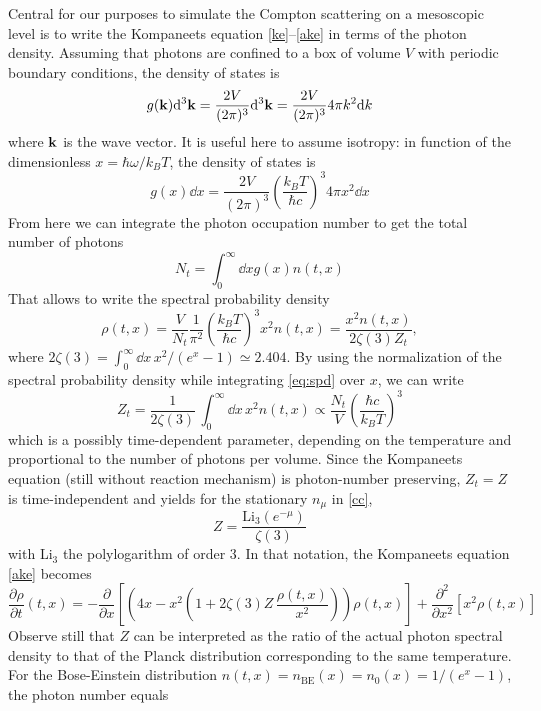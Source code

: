 \documentclass[a4paper,12pt,reqno,superscriptaddress,nofootinbib]{revtex4}
\newcommand{\0}{^{(0)}}
\newcommand{\1}{^{(1)}}
\newcommand{\2}{^{(2)}}
\begin{document}
Central for our purposes to simulate the Compton scattering on a mesoscopic level is to write the Kompaneets equation \eqref{ke}--\eqref{ake} in terms of the photon density. 
Assuming that photons are confined to a box of volume $V$ with periodic boundary conditions, the density of states is
\[
g(\vb{k}) \dd^3 \vb{k} = \frac{2V}{(2\pi)^3} \dd^3 \vb{k} = \frac{2V}{(2\pi)^3} 
4\pi k^2 \dd k
\]
where $\vb{k}$ is the wave vector.  It is useful here to 
assume isotropy: in function of the dimensionless $x = \hbar \omega / k_B T$, the density of states is
\[
g(x) \dd x = \frac{2V}{(2\pi)^3} \left( \frac{k_B T}{\hbar c} \right)^3 4\pi 
x^2 \dd x
\] 
From here we can integrate the photon occupation number to get the total number of photons
\[ N_t = \int_0^\infty \dd{x} g(x) n(t,x)
 \]
That allows to write the spectral probability density
\begin{equation}\label{eq:spd}
\rho(t,x) = \frac{V}{N_t} \frac{1}{\pi^2} \left(\frac{k_B T}{\hbar c}\right)^3 
x^2 n(t,x) = \frac{x^2 n(t,x)}{2\zeta(3) Z_t},
\end{equation}
where $2\zeta(3) = \int_0^\infty \dd x \, x^2/(e^x-1) \simeq 2.404$.
By using the normalization of the spectral probability density while integrating \eqref{eq:spd} over $x$, we can write
\begin{equation}\label{zy}
Z_t =  \frac 1{2\zeta(3)}\,\int_0^\infty \dd x\, x^2 n(t,x) \propto  \frac{N_t}{V} \left(\frac{\hbar c}{k_B T}\right)^3
\end{equation}
which is a possibly time-dependent parameter, depending on the temperature and 
proportional to the number of photons per volume. Since the Kompaneets equation (still without reaction mechanism)
is photon-number preserving, $Z_t=Z$ is time-independent and yields for the 
stationary $n_\mu$ in \eqref{cc},
\[
Z = \frac{\text{Li}_3 (e^{-\mu})}{\zeta(3)}
\]
with Li$_3$ the polylogarithm of order 3.
In that notation, the Kompaneets equation \eqref{ake} becomes
\begin{equation}\label{kp}
\frac{\partial \rho}{\partial t} (t,x) = -\frac{\partial}{\partial x}\left[\left(4x- x^2\left(1+2\zeta(3) Z\,\frac{\rho(t,x)}{x^2}\right)\right)\rho(t,x)\right] + \frac{\partial^2}{\partial x^2}\left[x^2 \rho(t,x)\right]
\end{equation}
Observe still that  $Z$
can be interpreted as the ratio of the actual photon spectral density to that 
of the Planck distribution corresponding to the same temperature.  For the 
Bose-Einstein distribution $n(t,x)= n_\text{BE}(x) = n_0(x) = 1 / (e^x - 1)$, 
the photon number equals
\end{document}
